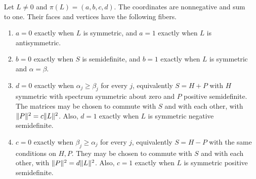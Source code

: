 \setcounter{theorem}{3}
\begin{theorem}
\label{thm:faces}
\leanok
{}
Let $L\ne0$ and $\pi(L)=(a,b,c,d)$. The coordinates are nonnegative
and sum to one. Their faces and vertices have the following fibers.
\begin{enumerate}
\item $a=0$ exactly when $L$ is symmetric, and $a=1$ exactly when
$L$ is antisymmetric.
\item $b=0$ exactly when $S$ is semidefinite, and $b=1$ exactly when
$L$ is symmetric and $\alpha=\beta$.
\item $d=0$ exactly when $\alpha_j\ge\beta_j$ for every $j$,
equivalently $S=H+P$ with $H$ symmetric with spectrum symmetric about
zero and $P$ positive semidefinite. The matrices may be chosen to
commute with $S$ and with each other, with
$\lVert P\rVert^2=c\lVert L\rVert^2$. Also, $d=1$ exactly when $L$ is symmetric
negative semidefinite.
\item $c=0$ exactly when $\beta_j\ge\alpha_j$ for every $j$,
equivalently $S=H-P$ with the same conditions on $H,P$. They may be
chosen to commute with $S$ and with each other, with
$\lVert P\rVert^2=d\lVert L\rVert^2$. Also, $c=1$ exactly when $L$ is symmetric
positive semidefinite.
\end{enumerate}
\end{theorem}
